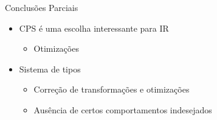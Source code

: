 \begin{frame}{Conclusões Parciais}
    \begin{itemize}
        \item CPS é uma escolha interessante para IR
              \begin{itemize}
                  \item Otimizações
              \end{itemize}
        \item Sistema de tipos
              \begin{itemize}
                  \item Correção de transformações e otimizações
                  \item Ausência de certos comportamentos indesejados
              \end{itemize}
    \end{itemize}
\end{frame}
